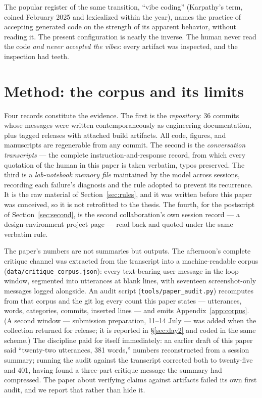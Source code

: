 \documentclass[12pt]{article}
\begin{document}
The popular register of the same transition, ``vibe coding'' (Karpathy's term, coined February 2025 and lexicalized within the year), names the practice of accepting generated code on the strength of its apparent behavior, without reading it. The present configuration is nearly the inverse. The human never read the code \emph{and never accepted the vibes}: every artifact was inspected, and the inspection had teeth.

\section{Method: the corpus and its limits}\label{sec:method}

Four records constitute the evidence. The first is the \emph{repository}: 36 commits whose messages were written contemporaneously as engineering documentation, plus tagged releases with attached build artifacts. All code, figures, and manuscripts are regenerable from any commit. The second is the \emph{conversation transcripts} — the complete instruction-and-response record, from which every quotation of the human in this paper is taken verbatim, typos preserved. The third is a \emph{lab-notebook memory file} maintained by the model across sessions, recording each failure's diagnosis and the rule adopted to prevent its recurrence. It is the raw material of Section~\ref{sec:rules}, and it was written before this paper was conceived, so it is not retrofitted to the thesis. The fourth, for the postscript of Section~\ref{sec:second}, is the second collaboration's own session record — a design-environment project page — read back and quoted under the same verbatim rule.

The paper's numbers are not summaries but outputs. The afternoon's complete critique channel was extracted from the transcript into a machine-readable corpus (\texttt{data/critique\_corpus.json}): every text-bearing user message in the loop window, segmented into utterances at blank lines, with seventeen screenshot-only messages logged alongside. An audit script (\texttt{tools/paper\_audit.py}) recomputes from that corpus and the git log every count this paper states — utterances, words, categories, commits, inserted lines — and emits Appendix~\ref{app:corpus}. (A second window — submission preparation, 11--14 July — was added when the collection returned for release; it is reported in \S\ref{sec:day2} and coded in the same scheme.) The discipline paid for itself immediately: an earlier draft of this paper said ``twenty-two utterances, 381 words,'' numbers reconstructed from a session summary; running the audit against the transcript corrected both to twenty-five and 401, having found a three-part critique message the summary had compressed. The paper about verifying claims against artifacts failed its own first audit, and we report that rather than hide it.
\end{document}
